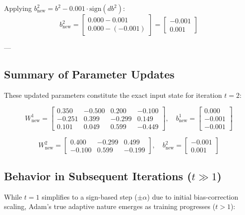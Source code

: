\documentclass[11pt]{article}
\begin{document}
Applying $b^2_{\text{new}} = b^2 - 0.001 \cdot \text{sign}(db^2)$:
\[
b^2_{\text{new}} =
\begin{bmatrix}
0.000 - 0.001 \\
0.000 - (-0.001)
\end{bmatrix}
=
\begin{bmatrix}
-0.001 \\
0.001
\end{bmatrix}
\]

---

\subsection{Summary of Parameter Updates}

These updated parameters constitute the exact input state for iteration $t=2$:

\[
W^1_{\text{new}} = \begin{bmatrix} 0.350 & -0.500 & 0.200 & -0.100 \\ -0.251 & 0.399 & -0.299 & 0.149 \\ 0.101 & 0.049 & 0.599 & -0.449 \end{bmatrix}, \quad
b^1_{\text{new}} = \begin{bmatrix} 0.000 \\ -0.001 \\ -0.001 \end{bmatrix}
\]

\[
W^2_{\text{new}} = \begin{bmatrix} 0.400 & -0.299 & 0.499 \\ -0.100 & 0.599 & -0.199 \end{bmatrix}, \quad
b^2_{\text{new}} = \begin{bmatrix} -0.001 \\ 0.001 \end{bmatrix}
\]

\subsection{Behavior in Subsequent Iterations (\texorpdfstring{$t \gg 1$}{t >> 1})}

While $t=1$ simplifies to a sign-based step ($\pm\alpha$) due to initial bias-correction scaling, Adam’s true adaptive nature emerges as training progresses ($t > 1$):
\end{document}
